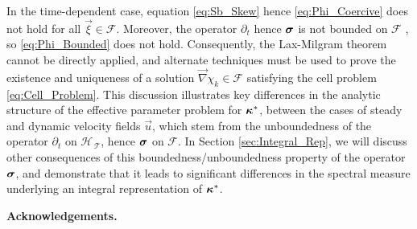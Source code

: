 \documentclass[11pt]{amsart}
\newcommand{\Tc}{\mathcal{T}}
\newcommand{\Hs}{\mathscr{H}}
\newcommand{\Fs}{\mathscr{F}}
\newcommand\bsig{\mbox{\boldmath${\sigma}$}}
\newcommand\bkappa{\mbox{\boldmath${\kappa}$}}
\begin{document}
In the time-dependent case, equation \eqref{eq:Sb_Skew} hence
\eqref{eq:Phi_Coercive} does not hold for all $\vec{\xi}\in\Fs$. Moreover, 
the operator $\partial_t$ hence $\bsig$ is not bounded on $\Fs$
\cite{Reed-1980,Stakgold:BVP:2000}, so \eqref{eq:Phi_Bounded} does not
hold. Consequently, the Lax-Milgram theorem cannot be directly
applied, and alternate techniques  
\cite{Friedman:1969:PDE,Friedman:1969:PDE:Parabolic} must be used to
prove the existence and uniqueness of a solution $\vec{\nabla}\chi_k\in\Fs$ 
satisfying the cell problem \eqref{eq:Cell_Problem}. This discussion
illustrates key differences in the analytic structure of the effective
parameter problem for $\bkappa^*$, between the cases of steady and
dynamic velocity fields $\vec{u}$, which stem from the unboundedness
of the operator $\partial_t$ on $\Hs_{\,\Tc}$, hence $\bsig$ on $\Fs$. In Section
\ref{sec:Integral_Rep}, we will discuss other consequences of this
boundedness/unboundedness property of the operator $\bsig$, and
demonstrate that it leads to significant differences in the spectral
measure underlying an  integral representation of $\bkappa^*$.     






\medskip

{\bf Acknowledgements.}


\medskip



\end{document}
